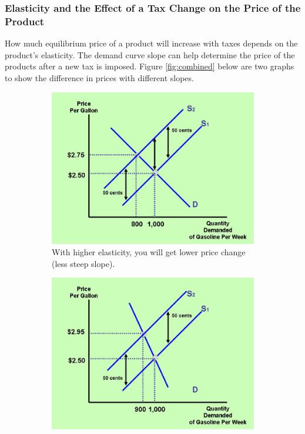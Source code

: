 \documentclass[a4paper, 12pt] {article}
\begin{document}
\subsubsection{Elasticity and the Effect of a Tax Change on the Price of the
Product}

How much equilibrium price of a product will increase with taxes depends on the
product's elasticity. The demand curve slope can help determine the price of the
products after a new tax is imposed. Figure \ref{fig:combined} below are two
graphs to show the difference in prices with different slopes.

\begin{figure}[ht]
    \centering
    \begin{subfigure}{0.41\textwidth}
        \centering
        \includegraphics[width=\textwidth] {elasticity_tax_minimal.jpg}
        \caption{With higher elasticity, you will get lower price change (less
        steep slope).}
        \label{fig:left_elas}
    \end{subfigure}
    \hspace{1mm}
    \begin{subfigure}{0.42\textwidth}
        \centering
        \includegraphics[width=\textwidth] {elasticity_tax_max.jpg}

\end{subfigure}
\end{figure}
\end{document}
